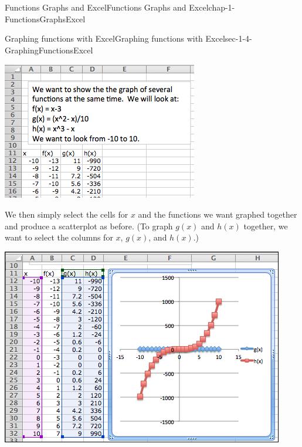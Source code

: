 \documentclass[oneside,10pt,]{book}
\numberwithin{equation}{section}
\begin{document}
\begin{chapterptx}{Functions Graphs and Excel}{}{Functions Graphs and Excel}{}{}{chap-1-FunctionsGraphsExcel}
\begin{sectionptx}{Graphing functions with Excel}{}{Graphing functions with Excel}{}{}{sec-1-4-GraphingFunctionsExcel}
\begin{sidebyside}{1}{0.2}{0.2}{0}
\begin{sbspanel}{0.6}
\includegraphics[width=1\linewidth]{images/sec1-4-10.png}
\end{sbspanel}%
\end{sidebyside}%
\par
\hypertarget{p-333}{}%
We then simply select the cells for \(x\) and the functions we want graphed together and produce a scatterplot as before.  (To graph \(g(x)\) and \(h(x)\) together, we want to select the columns for \(x\), \(g(x)\), and \(h(x)\).)%
\begin{sidebyside}{1}{0.1}{0.1}{0}%
\begin{sbspanel}{0.8}%
\includegraphics[width=1\linewidth]{images/sec1-4-11.png}
\end{sbspanel}%
\end{sidebyside}%
\par
\hypertarget{p-334}{}%

\end{sectionptx}
\end{chapterptx}
\end{document}
